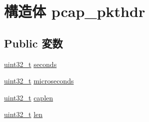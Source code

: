 \hypertarget{structpcap__pkthdr}{
\section{構造体 pcap\_\-pkthdr}
\label{structpcap__pkthdr}
}
\subsection*{Public 変数}
\begin{DoxyCompactItemize}
\item 
\hyperlink{Type_8hh_a435d1572bf3f880d55459d9805097f62}{uint32\_\-t} \hyperlink{structpcap__pkthdr_a6d5694839ec935781627e5c52de21fda}{seconds}
\item 
\hyperlink{Type_8hh_a435d1572bf3f880d55459d9805097f62}{uint32\_\-t} \hyperlink{structpcap__pkthdr_a147625fbb638ec48118787a657c79063}{microseconds}
\item 
\hyperlink{Type_8hh_a435d1572bf3f880d55459d9805097f62}{uint32\_\-t} \hyperlink{structpcap__pkthdr_a924ae36d85e1e33da9650b316262a990}{caplen}
\item 
\hyperlink{Type_8hh_a435d1572bf3f880d55459d9805097f62}{uint32\_\-t} \hyperlink{structpcap__pkthdr_a96bbf959016e4411c9e6b9812a8be60a}{len}
\end{DoxyCompactItemize}


